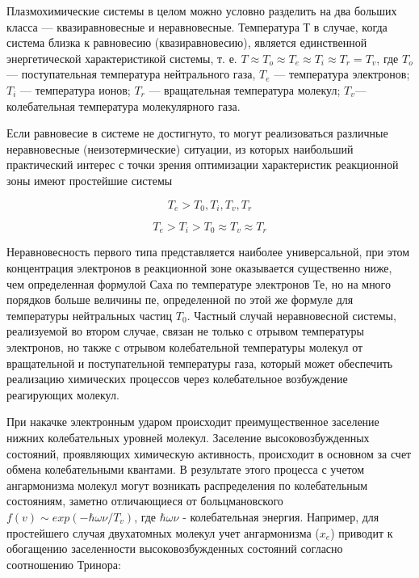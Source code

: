 \documentclass[10pt, a4paper]{article}
\begin{document}
Плазмохимические системы в целом можно условно разделить на два больших класса — квазиравновесные и неравновесные.
Температура Т в случае, когда система близка к равновесию (квазиравновесию), является единственной энергетической характеристикой системы, т. е. $T \approx T_{o} \approx T_{e} \approx T_{i} \approx  T_{r} = T_{v}$, где $T_{o}$ — поступательная температура нейтрального газа, $T_e$ — температура электронов; $T_i$ — температура ионов; $T_r$ — вращательная температура молекул; $T_v$— колебательная температура молекулярного газа. 

Если равновесие в системе не достигнуто, то могут реализоваться различные неравновесные (неизотермические) ситуации, из которых наибольший практический интерес с точки зрения оптимизации характеристик реакционной зоны имеют простейшие системы 

\begin{equation}
T_e > T_0, T_i, T_v,T_r
\end{equation}

\begin{equation}
T_e > T_i > T_0  \approx T_v  \approx T_r
\end{equation}

Неравновесность первого типа представляется наиболее универсальной, при этом концентрация электронов в реакционной зоне оказывается существенно ниже, чем определенная формулой Саха по температуре электронов Те, но на много порядков больше величины пе, определенной по этой же формуле для температуры  нейтральных частиц $T_0$. Частный случай неравновесной системы, реализуемой во втором случае, связан не только с отрывом температуры электронов, но также с отрывом колебательной температуры  молекул от вращательной и поступательной температуры газа, который может обеспечить реализацию химических процессов через колебательное возбуждение реагирующих молекул. 

При накачке электронным ударом происходит преимущественное заселение нижних колебательных уровней молекул. Заселение высоковозбужденных состояний, проявляющих химическую активность, происходит в основном за счет обмена колебательными квантами. В результате этого процесса с учетом ангармонизма молекул могут возникать распределения по колебательным состояниям, заметно отличающиеся от больцмановского $f(v) \sim exp(-\hbar \omega \nu / T_v)$, где $\hbar \omega \nu$ - колебательная энергия. Например, для простейшего случая двухатомных молекул учет ангармонизма ($x_e$) приводит к обогащению заселенности высоковозбужденных состояний согласно соотношению Тринора:
\end{document}
